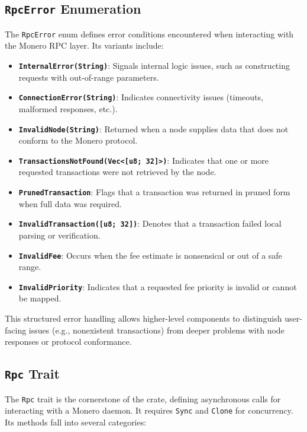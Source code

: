 \documentclass[12pt,a4paper]{article}
\begin{document}
\subsection{\texttt{RpcError} Enumeration}
\label{sec:monero-rpc-rpcerror}

The \texttt{RpcError} enum defines error conditions encountered when interacting with the Monero
RPC layer. Its variants include:

\begin{itemize}
    \item \textbf{\texttt{InternalError(String)}}: Signals internal logic issues, such as
    constructing requests with out-of-range parameters.
    \item \textbf{\texttt{ConnectionError(String)}}: Indicates connectivity issues (timeouts,
    malformed responses, etc.).
    \item \textbf{\texttt{InvalidNode(String)}}: Returned when a node supplies data that does not
    conform to the Monero protocol.
    \item \textbf{\texttt{TransactionsNotFound(Vec<[u8; 32]>)}}: Indicates that one or more
    requested transactions were not retrieved by the node.
    \item \textbf{\texttt{PrunedTransaction}}: Flags that a transaction was returned in pruned form
    when full data was required.
    \item \textbf{\texttt{InvalidTransaction([u8; 32])}}: Denotes that a transaction failed local
    parsing or verification.
    \item \textbf{\texttt{InvalidFee}}: Occurs when the fee estimate is nonsensical or out of a safe
    range.
    \item \textbf{\texttt{InvalidPriority}}: Indicates that a requested fee priority is invalid or
    cannot be mapped.
\end{itemize}

This structured error handling allows higher-level components to distinguish user-facing issues
(e.g., nonexistent transactions) from deeper problems with node responses or protocol conformance.

\subsection{\texttt{Rpc} Trait}
\label{sec:monero-rpc-rpc-trait}

The \texttt{Rpc} trait is the cornerstone of the crate, defining asynchronous calls for interacting
with a Monero daemon. It requires \texttt{Sync} and \texttt{Clone} for concurrency. Its methods fall
into several categories:
\end{document}
